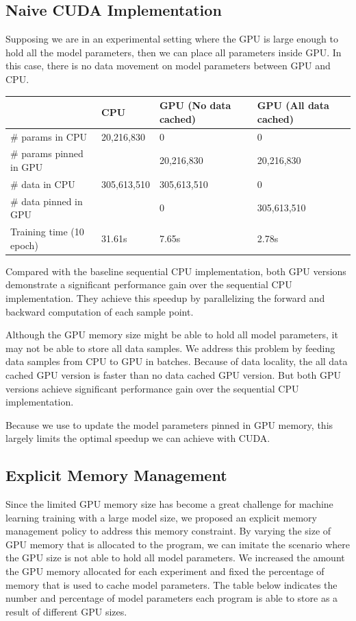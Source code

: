 \documentclass{article}
\begin{document}
\subsection*{Naive CUDA Implementation}
Supposing we are in an experimental setting where the GPU is large enough to hold all the model parameters, then we can place all parameters inside GPU. In this case, there is no data movement on model parameters between GPU and CPU.

\begin{table}[!ht]
    \centering
    \begin{tabular}{|l|l|l|l|}
    \hline
        \ & CPU & GPU (No data cached) & GPU (All data cached) \\ \hline
        \# params in CPU & 20,216,830  & 0 & 0  \\ \hline
        \# params pinned in GPU & \ & 20,216,830 & 20,216,830  \\ \hline
        \# data in CPU & 305,613,510 & 305,613,510 & 0  \\ \hline
        \# data pinned in GPU & \ & 0 & 305,613,510  \\ \hline
        Training time (10 epoch) & 31.61s & 7.65s & 2.78s  \\ \hline
    \end{tabular}
\end{table}

Compared with the baseline sequential CPU implementation, both GPU versions demonstrate a significant performance gain over the sequential CPU implementation. They achieve this speedup by parallelizing the forward and backward computation of each sample point.

Although the GPU memory size might be able to hold all model parameters, it may not be able to store all data samples. We address this problem by feeding data samples from CPU to GPU in batches. Because of data locality, the all data cached GPU version is faster than no data cached GPU version. But both GPU versions achieve significant performance gain over the sequential CPU implementation.

Because we use  to update the model parameters pinned in GPU memory, this largely limits the optimal speedup we can achieve with CUDA.

\subsection*{Explicit Memory Management}
Since the limited GPU memory size has become a great challenge for machine learning training with a large model size, we proposed an explicit memory management policy to address this memory constraint. By varying the size of GPU memory that is allocated to the program, we can imitate the scenario where the GPU size is not able to hold all model parameters. We increased the amount the GPU memory allocated for each experiment and fixed the percentage of memory that is used to cache model parameters. The table below indicates the number and percentage of model parameters each program is able to store as a result of different GPU sizes.
\end{document}
